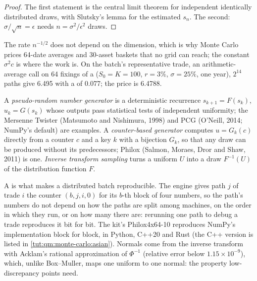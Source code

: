 \begin{proof}
The first statement is the central limit theorem for independent identically distributed draws, with Slutsky's lemma for the estimated $s_n$. The second: $\sigma/\sqrt n = \epsilon$ needs $n =
\sigma^2/\epsilon^2$ draws.
\end{proof}

The rate $n^{-1/2}$ does not depend on the dimension, which is why Monte Carlo prices 64-date averages and 30-asset baskets that no grid can reach; the constant $\sigma^2c$ is where the work
is. On the batch's representative trade, an arithmetic-average call on 64 fixings of a  ($S_0 = K = 100$, $r = 3\%$, $\sigma = 25\%$, one year), $2^{14}$ paths give
6.495 with a  of 0.077; the price is 6.4788.

\begin{definition}\label{def:qm:monte-carlo:prng}
A \emph{pseudo-random number generator} is a deterministic recurrence $s_{k+1} = F(s_k)$, $u_k = G(s_k)$ whose outputs pass statistical tests of
independent uniformity; the Mersenne Twister (Matsumoto and Nishimura, 1998) and PCG (O'Neill, 2014; NumPy's default) are examples. A \emph{counter-based generator} computes $u = G_k(c)$ directly from a counter $c$ and a key $k$ with a bijection $G_k$, so that any draw can be produced without its predecessors; Philox (Salmon, Moraes, Dror
and Shaw, 2011) is one. \emph{Inverse transform sampling} turns a uniform $U$ into a draw $F^{-1}(U)$ of the distribution function $F$.
\end{definition}

A  is what makes a distributed batch reproducible. The engine gives path $j$ of trade $i$ the counter $(b, j, i, 0)$ for its $b$-th block of four numbers, so
the path's numbers do not depend on how the paths are split among machines, on the order in which they run, or on how many there are: rerunning one path to debug a trade reproduces it bit for
bit. The kit's Philox4x64-10 reproduces NumPy's implementation block for block, in Python, C++20 and Rust (the C++ version is listed in \cref{tut:qm:monte-carlo:asian}). Normals come from the inverse transform with
Acklam's rational approximation of $\Phi^{-1}$ (relative error below $1.15 \times 10^{-9}$), which, unlike Box--Muller, maps one uniform to one normal: the property low-discrepancy points need.

